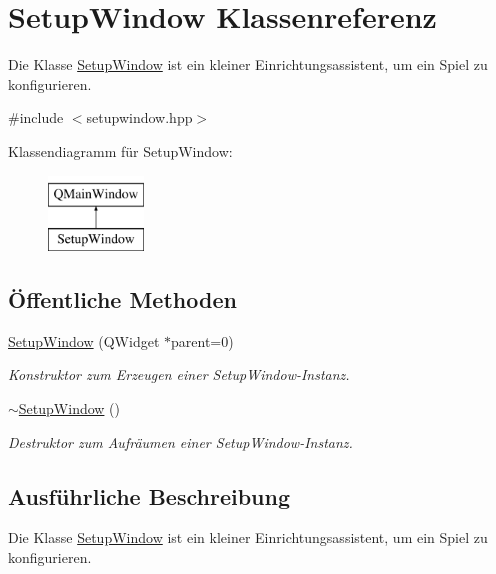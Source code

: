 \hypertarget{class_setup_window}{}\section{Setup\+Window Klassenreferenz}
\label{class_setup_window}


Die Klasse \hyperlink{class_setup_window}{Setup\+Window} ist ein kleiner Einrichtungsassistent, um ein Spiel zu konfigurieren.  




{\ttfamily \#include $<$setupwindow.\+hpp$>$}

Klassendiagramm für Setup\+Window\+:\begin{figure}[H]
\begin{center}
\leavevmode
\includegraphics[height=2.000000cm]{class_setup_window}
\end{center}
\end{figure}
\subsection*{Öffentliche Methoden}
\begin{DoxyCompactItemize}
\item 
\hyperlink{class_setup_window_ae347da397b49800fca6a95c28a971acf}{Setup\+Window} (Q\+Widget $\ast$parent=0)
\begin{DoxyCompactList}\small\item\em Konstruktor zum Erzeugen einer Setup\+Window-\/\+Instanz. \end{DoxyCompactList}\item 
\hyperlink{class_setup_window_a5f825603c8e001970506c52be4755fd8}{$\sim$\+Setup\+Window} ()
\begin{DoxyCompactList}\small\item\em Destruktor zum Aufräumen einer Setup\+Window-\/\+Instanz. \end{DoxyCompactList}\end{DoxyCompactItemize}


\subsection{Ausführliche Beschreibung}
Die Klasse \hyperlink{class_setup_window}{Setup\+Window} ist ein kleiner Einrichtungsassistent, um ein Spiel zu konfigurieren. 

